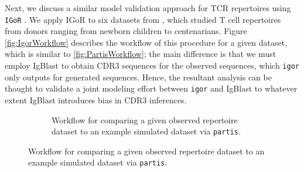 \documentclass{article}
\begin{document}
Next, we discuss a similar model validation approach for TCR repertoires using \texttt{IGoR} \cite{Marcou2018-du}.
We apply IGoR to six datasets from \cite{Britanova2016-iw}, which studied T cell repertoires from donors ranging from newborn children to centenarians.
Figure \ref{fig:IgorWorkflow} describes the workflow of this procedure for a given dataset, which is similar to \ref{fig:PartisWorkflow}; the main difference is that we must employ IgBlast to obtain CDR3 sequences for the observed sequences, which \texttt{igor} only outputs for generated sequences.
Hence, the resultant analysis can be thought to validate a joint modeling effort between \texttt{igor} and IgBlast to whatever extent IgBlast introduces bias in CDR3 inferences.

\begin{figure}
    \begin{subfigure}{0.5\textwidth}
    \begin{adjustbox}{max totalsize={\textwidth}{.5\textheight},center}
    \end{adjustbox}
    \caption{Workflow for comparing a given observed repertoire dataset to an example simulated dataset via \texttt{partis}.}

\end{subfigure}
\end{figure}
\end{document}
